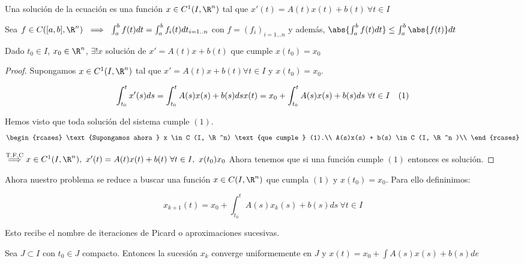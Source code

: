 \begin{ndef}

  Una solución de la ecuación es una función $x \in C^1 (I, \R ^n )$ tal que $x'(t) = A(t) x(t) + b(t) \ \forall t \in I$

\end{ndef}

Sea $f\in C([a,b], \R ^n ) \ \implies \ \int_a ^b f(t) dt = \int _a ^b f_i (t) dt _{i = 1..n} $ con $f = (f_i)_{i = 1...n}$ y además, $ \abs{ \int _a ^b f(t) dt } \leq \int_a ^b \abs{f(t)} dt $

\begin{nth}

  Dado $t_0 \in I$, $x_0 \in \R ^n $, $\exists ! x $ solución de $x' = A(t)x+b(t)$ que cumple $x(t_0) = x_0 $

\end{nth}

\begin{proof}

  Supongamos $x \in C^1 (I, \R ^n) $ tal que $x' = A(t) x + b(t) \forall t \in I$ y $x(t_0) = x_0$.

  \[
  \int _{t_0} ^t x'(s) ds = \int _{t_0} ^t A(s)x(s) + b(s) ds\\
  x(t) = x_0 + \int _{t_0} ^t A(s)x(s) + b(s) ds \ \forall t \in I \ \ \ (1)
  \]

  Hemos visto que toda solución del sistema cumple $(1)$.
\[
  \begin{rcases}
    \text{Supongamos ahora } x \in C (I, \R ^n) \text{que cumple } (1).\\
    A(s)x(s) + b(s) \in C (I, \R ^n )\\
  \end{rcases}
\]
  	
  $\overset{\text{T.F.C}}{\implies} x \in C ^1 (I, \R^n), \ x'(t) = A(t)x(t) + b(t) \ \forall t \in I, \ x(t_0 ) x_0 $
  Ahora tenemos que si una función cumple $(1)$ entonces es solución.


\end{proof}

Ahora nuestro problema se reduce a buscar una función $x \in C (I , \R ^n)$ que cumpla $(1)$ y $x(t_0) = x_0 $.
Para ello defininimos:

\[
x_{k+1} (t) = x_0 + \int _{t_0} ^t A(s)x_k (s) + b(s) ds \ \forall t \in I
\]

Esto recibe el nombre de iteraciones de Picard o aproximaciones sucesivas.

Sea $J \subset I$ con $t_0 \in J$ compacto. Entonces la sucesión ${x_k}$ converge uniformemente en $J$ y $x(t) = x_0 + \int A(s)x(s) + b(s) de $


